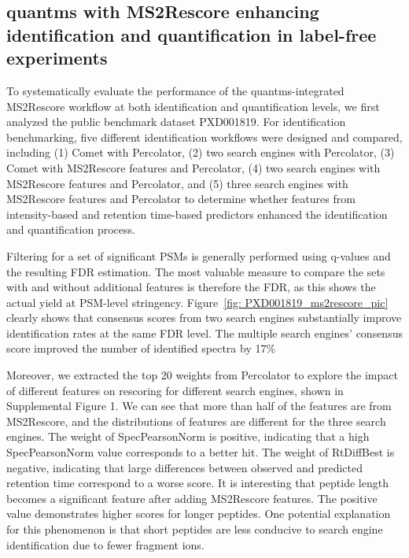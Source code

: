 \documentclass[12pt]{article}
\begin{document}
\subsection{quantms with MS2Rescore enhancing identification and quantification in label-free experiments}
To systematically evaluate the performance of the quantms-integrated MS2Rescore workflow at both identification and quantification levels, we first analyzed the public benchmark dataset PXD001819. For identification benchmarking, five different identification workflows were designed and compared, including (1) Comet with Percolator, (2) two search engines with Percolator, (3) Comet with MS2Rescore features and Percolator, (4) two search engines with MS2Rescore features and Percolator, and (5) three search engines with MS2Rescore features and Percolator to determine whether features from intensity-based and retention time-based predictors enhanced the identification and quantification process.

Filtering for a set of significant PSMs is generally performed using q-values and the resulting FDR estimation. The most valuable measure to compare the sets with and without additional features is therefore the FDR, as this shows the actual yield at PSM-level stringency. Figure~\ref{fig: PXD001819_ms2rescore_pic} clearly shows that consensus scores from two search engines substantially improve identification rates at the same FDR level. The multiple search engines' consensus score improved the number of identified spectra by 17\% %

Moreover, we extracted the top 20 weights from Percolator to explore the impact of different features on rescoring for different search engines, shown in Supplemental Figure 1. We can see that more than half of the features are from MS2Rescore, and the distributions of features are different for the three search engines. The weight of SpecPearsonNorm is positive, indicating that a high SpecPearsonNorm value corresponds to a better hit. The weight of RtDiffBest is negative, indicating that large differences between observed and predicted retention time correspond to a worse score. It is interesting that peptide length becomes a significant feature after adding MS2Rescore features. The positive value demonstrates higher scores for longer peptides. One potential explanation for this phenomenon is that short peptides are less conducive to search engine identification due to fewer fragment ions.
\end{document}
